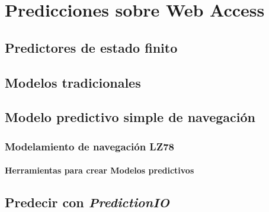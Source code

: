 \chapter[Predicciones sobre Web Access]{Predicciones sobre Web Access}\label{ch:predicciones-webaccess}







\section{Predictores de estado finito}
	

\section{Modelos tradicionales}
	


\section{Modelo predictivo simple de navegación }
	
	
	\subsection{Modelamiento de navegación LZ78}
		




\subsubsection{Herramientas para crear Modelos predictivos}

\section{Predecir con \emph{PredictionIO}}



